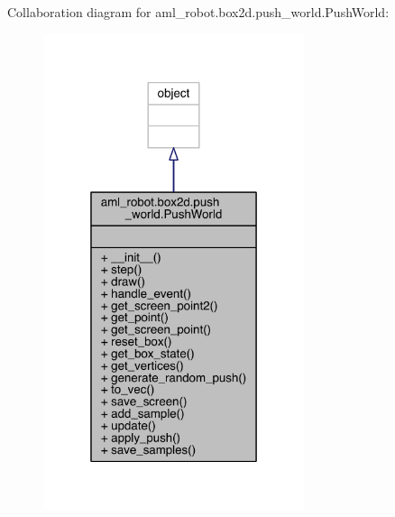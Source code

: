 Collaboration diagram for aml\+\_\+robot.\+box2d.\+push\+\_\+world.\+Push\+World\+:
\nopagebreak
\begin{figure}[H]
\begin{center}
\leavevmode
\includegraphics[width=217pt]{classaml__robot_1_1box2d_1_1push__world_1_1_push_world__coll__graph}
\end{center}
\end{figure}
